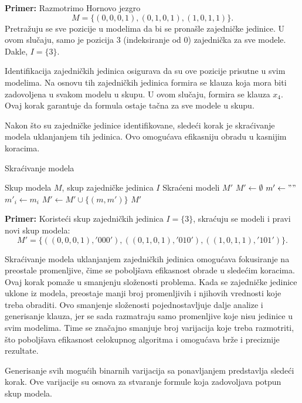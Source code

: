\documentclass[12pt,oneside]{memoir}
\begin{document}
\textbf{Primer:} Razmotrimo Hornovo jezgro 
\[
M = \{(0, 0, 0, 1), (0, 1, 0, 1), (1, 0, 1, 1)\}\text{.}
\]
Pretražuju se sve pozicije u modelima da bi se pronašle zajedničke jedinice. U ovom slučaju, samo je pozicija 3 (indeksiranje od 0) zajednička za sve modele. Dakle, $I = \{3\} $.

Identifikacija zajedničkih jedinica osigurava da su ove pozicije prisutne u svim modelima. Na osnovu tih zajedničkih jedinica formira se klauza koja mora biti zadovoljena u svakom modelu u skupu. U ovom slučaju, formira se klauza $x_4$. Ovaj korak garantuje da formula ostaje tačna za sve modele u skupu.

Nakon što su zajedničke jedinice identifikovane, sledeći korak je skraćivanje modela uklanjanjem tih jedinica. Ovo omogućava efikasniju obradu u kasnijim koracima.\\

\begin{algorithm}[H]
\caption{Skraćivanje modela}
\renewcommand{\algorithmicrequire}{\textbf{Ulaz:}}
\renewcommand{\algorithmicensure}{\textbf{Izlaz:}}
\begin{algorithmic}[1]
\REQUIRE Skup modela $M$, skup zajedničke jedinica $I$
\ENSURE Skraćeni modeli $M'$
\STATE $M' \gets \emptyset$
    \STATE $m' \gets ""$
            \STATE $m'_i \gets m_i$
        \ENDIF
    \ENDFOR
    \STATE $M' \gets M' \cup \{(m, m')\}$
\ENDFOR
\RETURN $M'$
\end{algorithmic}
\end{algorithm}

\textbf{Primer:} Koristeći skup zajedničkih jedinica $ I = \{3\} $, skraćuju se modeli i pravi novi skup modela:
\[
M' = \{((0, 0, 0, 1), '000'), ((0, 1, 0, 1), '010'), ((1, 0, 1, 1), '101')\}\text{.}
\] 

Skraćivanje modela uklanjanjem zajedničkih jedinica omogućava fokusiranje na preostale promenljive, čime se poboljšava efikasnost obrade u sledećim koracima. Ovaj korak pomaže u smanjenju složenosti problema. Kada se zajedničke jedinice uklone iz modela, preostaje manji broj promenljivih i njihovih vrednosti koje treba obraditi. Ovo smanjenje složenosti pojednostavljuje dalje analize i generisanje klauza, jer se sada razmatraju samo promenljive koje nisu jedinice u svim modelima. Time se značajno smanjuje broj varijacija koje treba razmotriti, što poboljšava efikasnost celokupnog algoritma i omogućava brže i preciznije rezultate.


Generisanje svih mogućih binarnih varijacija sa ponavljanjem predstavlja sledeći korak. Ove varijacije su osnova za stvaranje formule koja zadovoljava potpun skup modela.\\
\end{document}
